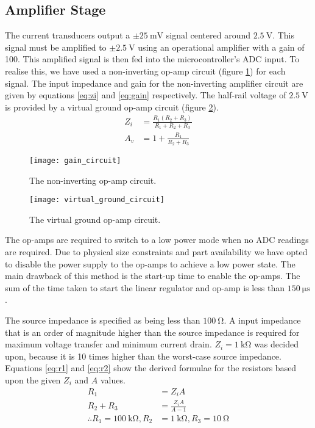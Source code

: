 \subsection{Amplifier Stage}

The current transducers output a $\pm \SI{25}{\milli\volt}$ signal centered around $\SI{2.5}{\volt}$.
This signal must be amplified to $\pm \SI{2.5}{\volt}$ using an operational amplifier with a gain of 100.
This amplified signal is then fed into the microcontroller's ADC input.
To realise this, we have used a non-inverting op-amp circuit (figure \ref{fig:non-inverting-op-amp}) for each signal.
The input impedance and gain for the non-inverting amplifier circuit are given by equations \ref{eq:zi} and \ref{eq:gain} respectively.
The half-rail voltage of $\SI{2.5}{\volt}$ is provided by a virtual ground op-amp circuit (figure \ref{fig:half-supply}).
\begin{align}
	Z_i &= \frac{R_1 (R_2 + R_3)}{R_1 + R_2 + R_3} \label{eq:zi} \\
	A_v &= 1 + \frac{R_1}{R_2 + R_3}\label{eq:gain}
\end{align}

\begin{figure}[H]
	\centering
	\texttt{[image: gain\_circuit]}
	\caption{The non-inverting op-amp circuit.}
	\label{fig:non-inverting-op-amp}
\end{figure}

\begin{figure}[H]
	\centering
	\texttt{[image: virtual\_ground\_circuit]}
	\caption{The virtual ground op-amp circuit.}
	\label{fig:half-supply}
\end{figure}

The op-amps are required to switch to a low power mode when no ADC readings are required.
Due to physical size constraints and part availability we have opted to disable the power supply to the op-amps to achieve a low power state.
The main drawback of this method is the start-up time to enable the op-amps.
The sum of the time taken to start the linear regulator and op-amp is less than $\SI{150}{\micro\second}$.

The source impedance is specified as being less than $\SI{100}{\ohm}$.
A input impedance that is an order of magnitude higher than the source impedance is required for maximum voltage transfer and minimum current drain.
$Z_i = \SI{1}{\kilo\ohm}$ was decided upon, because it is 10 times higher than the worst-case source impedance.
Equations \ref{eq:r1} and \ref{eq:r2} show the derived formulae for the resistors based upon the given $Z_i$ and $A$ values.
\begin{align}
	R_1 &= Z_i A \label{eq:r1} \\
	R_2 + R_3 &= \frac{Z_i A}{A - 1} \label{eq:r2} \\[1em]
	\therefore R_1 = \SI{100}{\kilo\ohm}, R_2 &= \SI{1}{\kilo\ohm}, R_3 = \SI{10}{\ohm} \nonumber
\end{align}

